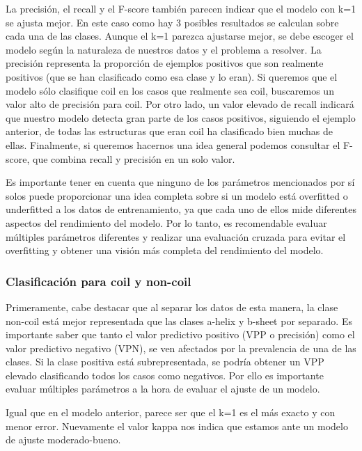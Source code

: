\documentclass[
]{article}
\begin{document}
La precisión, el recall y el F-score también parecen indicar que el
modelo con k=1 se ajusta mejor. En este caso como hay 3 posibles
resultados se calculan sobre cada una de las clases. Aunque el k=1
parezca ajustarse mejor, se debe escoger el modelo según la naturaleza
de nuestros datos y el problema a resolver. La precisión representa la
proporción de ejemplos positivos que son realmente positivos (que se han
clasificado como esa clase y lo eran). Si queremos que el modelo sólo
clasifique coil en los casos que realmente sea coil, buscaremos un valor
alto de precisión para coil. Por otro lado, un valor elevado de recall
indicará que nuestro modelo detecta gran parte de los casos positivos,
siguiendo el ejemplo anterior, de todas las estructuras que eran coil ha
clasificado bien muchas de ellas. Finalmente, si queremos hacernos una
idea general podemos consultar el F-score, que combina recall y
precisión en un solo valor.

Es importante tener en cuenta que ninguno de los parámetros mencionados
por sí solos puede proporcionar una idea completa sobre si un modelo
está overfitted o underfitted a los datos de entrenamiento, ya que cada
uno de ellos mide diferentes aspectos del rendimiento del modelo. Por lo
tanto, es recomendable evaluar múltiples parámetros diferentes y
realizar una evaluación cruzada para evitar el overfitting y obtener una
visión más completa del rendimiento del modelo.

\hypertarget{clasificaciuxf3n-para-coil-y-non-coil}{%
\subsubsection{Clasificación para coil y
non-coil}\label{clasificaciuxf3n-para-coil-y-non-coil}}

Primeramente, cabe destacar que al separar los datos de esta manera, la
clase non-coil está mejor representada que las clases a-helix y b-sheet
por separado. Es importante saber que tanto el valor predictivo positivo
(VPP o precisión) como el valor predictivo negativo (VPN), se ven
afectados por la prevalencia de una de las clases. Si la clase positiva
está subrepresentada, se podría obtener un VPP elevado clasificando
todos los casos como negativos. Por ello es importante evaluar múltiples
parámetros a la hora de evaluar el ajuste de un modelo.

Igual que en el modelo anterior, parece ser que el k=1 es el más exacto
y con menor error. Nuevamente el valor kappa nos indica que estamos ante
un modelo de ajuste moderado-bueno.
\end{document}
